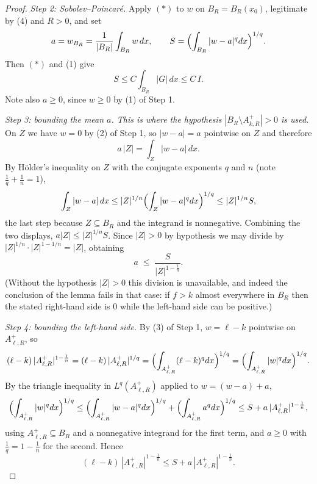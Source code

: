 \begin{proof}
\emph{Step 2: Sobolev--Poincar\'e.}  Apply $(*)$ to $w$ on $B_R=B_R(x_0)$,
legitimate by (4) and $R>0$, and set
\[
a=w_{B_R}=\frac1{|B_R|}\int_{B_R}w\,dx,
\qquad
S=\Bigl(\int_{B_R}|w-a|^{q}dx\Bigr)^{1/q} .
\]
Then $(*)$ and (1) give
\[
S\le C\int_{B_R}|G|\,dx\le C\,I .
\tag{2}
\]
Note also $a\ge0$, since $w\ge0$ by (1) of Step 1.

\emph{Step 3: bounding the mean $a$.  This is where the hypothesis
$|B_R\setminus A^+_{k,R}|>0$ is used.}  On $Z$ we have $w=0$ by (2) of Step 1,
so $|w-a|=a$ pointwise on $Z$ and therefore
\[
a\,|Z|=\int_Z|w-a|\,dx .
\]
By H\"older's inequality on $Z$ with the conjugate exponents $q$ and $n$ (note
$\frac1q+\frac1n=1$),
\[
\int_Z|w-a|\,dx\le|Z|^{1/n}\Bigl(\int_Z|w-a|^{q}dx\Bigr)^{1/q}\le|Z|^{1/n}S ,
\]
the last step because $Z\subseteq B_R$ and the integrand is nonnegative.
Combining the two displays, $a|Z|\le|Z|^{1/n}S$.  Since $|Z|>0$ by hypothesis we
may divide by $|Z|^{1/n}\cdot|Z|^{1-1/n}=|Z|$, obtaining
\[
a\;\le\;\frac{S}{|Z|^{1-\frac1n}} .
\tag{3}
\]
(Without the hypothesis $|Z|>0$ this division is unavailable, and indeed the
conclusion of the lemma fails in that case: if $f>k$ almost everywhere in $B_R$
then the stated right-hand side is $0$ while the left-hand side can be positive.)

\emph{Step 4: bounding the left-hand side.}  By (3) of Step 1, $w=\ell-k$
pointwise on $A^+_{\ell,R}$, so
\[
(\ell-k)\,|A^+_{\ell,R}|^{1-\frac1n}
=(\ell-k)\,|A^+_{\ell,R}|^{1/q}
=\Bigl(\int_{A^+_{\ell,R}}(\ell-k)^{q}dx\Bigr)^{1/q}
=\Bigl(\int_{A^+_{\ell,R}}|w|^{q}dx\Bigr)^{1/q} .
\]
By the triangle inequality in $L^{q}(A^+_{\ell,R})$ applied to $w=(w-a)+a$,
\[
\Bigl(\int_{A^+_{\ell,R}}|w|^{q}dx\Bigr)^{1/q}
\le\Bigl(\int_{A^+_{\ell,R}}|w-a|^{q}dx\Bigr)^{1/q}
+\Bigl(\int_{A^+_{\ell,R}}a^{q}dx\Bigr)^{1/q}
\le S+a\,|A^+_{\ell,R}|^{1-\frac1n} ,
\]
using $A^+_{\ell,R}\subseteq B_R$ and a nonnegative integrand for the first term,
and $a\ge0$ with $\frac1q=1-\frac1n$ for the second.  Hence
\[
(\ell-k)\,|A^+_{\ell,R}|^{1-\frac1n}\le S+a\,|A^+_{\ell,R}|^{1-\frac1n} .
\tag{4}
\]


\end{proof}
